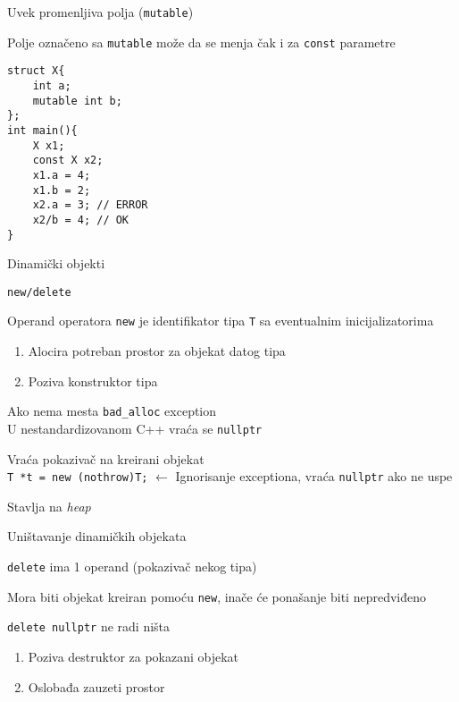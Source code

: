 \documentclass{article}
\newenvironment{xitemize}{%
    
    \itemize
    \larger
}{%
    \enditemize
}
\let\olditemize\itemize
\let\endolditemize\enditemize
\renewenvironment{itemize}{%
    \smaller
    \olditemize
}{%
    \endolditemize
}
\providecommand{\inlinecode}[1]{\texttt{#1}}
\begin{document}
\begin{xitemize}
\item Uvek promenljiva polja (\inlinecode{mutable})
\begin{itemize}
    \item Polje označeno sa \inlinecode {mutable} može da se menja čak i za \inlinecode {const} parametre
    \begin{lstlisting}
struct X{
    int a;
    mutable int b;
};
int main(){
    X x1;
    const X x2;
    x1.a = 4;
    x1.b = 2;
    x2.a = 3; // ERROR
    x2/b = 4; // OK
}
    \end{lstlisting}
\end{itemize}

\newpage
\item Dinamički objekti
\begin{itemize}
    \item \inlinecode {new/delete}
    \item Operand operatora \inlinecode {new} je identifikator tipa \inlinecode T sa eventualnim inicijalizatorima
    \begin{enumerate}
        \item Alocira potreban prostor za objekat datog tipa
        \item Poziva konstruktor tipa
    \end{enumerate}
    \item Ako nema mesta \inlinecode {bad\_alloc} exception\\
    U nestandardizovanom C++ vraća se \inlinecode {nullptr}
    \item Vraća pokazivač na kreirani objekat\\
    \inlinecode{T *t = new (nothrow)T;} $\longleftarrow$ Ignorisanje exceptiona, vraća \inlinecode{nullptr} ako ne uspe
    \item Stavlja na \textit{heap}
\end{itemize}
\item Uništavanje dinamičkih objekata
\begin{itemize}
    \item \inlinecode {delete} ima 1 operand (pokazivač nekog tipa)
    \item Mora biti objekat kreiran pomoću \inlinecode {new}, inače će ponašanje biti nepredviđeno
    \item  \inlinecode{delete nullptr} ne radi ništa
    \begin{enumerate}
        \item Poziva destruktor za pokazani objekat
        \item Oslobađa zauzeti prostor

\end{enumerate}
\end{itemize}
\end{xitemize}
\end{document}
